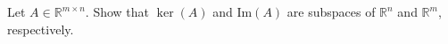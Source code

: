 Let $A\in \mathbb{R}^{m \times n}$. Show that $\ker (A)$ and $\text{Im} (A)$ are subspaces of $\mathbb{R}^n$ and $\mathbb{R}^m$, respectively.